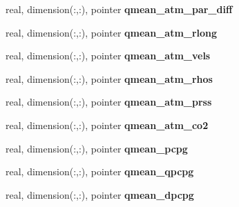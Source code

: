 \begin{DoxyCompactItemize}
\item 
\hypertarget{structed__state__vars_1_1edtype_a729f347831047888a173f91b1528e802}{
real, dimension(:,:), pointer {\bfseries qmean\_\-atm\_\-par\_\-diff}}
\label{structed__state__vars_1_1edtype_a729f347831047888a173f91b1528e802}

\item 
\hypertarget{structed__state__vars_1_1edtype_a7e1ef6fca94d18cf62099af6605ae610}{
real, dimension(:,:), pointer {\bfseries qmean\_\-atm\_\-rlong}}
\label{structed__state__vars_1_1edtype_a7e1ef6fca94d18cf62099af6605ae610}

\item 
\hypertarget{structed__state__vars_1_1edtype_a9226049075f34228b2ad9645bfea5906}{
real, dimension(:,:), pointer {\bfseries qmean\_\-atm\_\-vels}}
\label{structed__state__vars_1_1edtype_a9226049075f34228b2ad9645bfea5906}

\item 
\hypertarget{structed__state__vars_1_1edtype_ad917102325828e0f6bf2cff74c19977e}{
real, dimension(:,:), pointer {\bfseries qmean\_\-atm\_\-rhos}}
\label{structed__state__vars_1_1edtype_ad917102325828e0f6bf2cff74c19977e}

\item 
\hypertarget{structed__state__vars_1_1edtype_add7427e055e0cc736ab6741161d65353}{
real, dimension(:,:), pointer {\bfseries qmean\_\-atm\_\-prss}}
\label{structed__state__vars_1_1edtype_add7427e055e0cc736ab6741161d65353}

\item 
\hypertarget{structed__state__vars_1_1edtype_a5c92ef6430ff924198b4d042e7a106f0}{
real, dimension(:,:), pointer {\bfseries qmean\_\-atm\_\-co2}}
\label{structed__state__vars_1_1edtype_a5c92ef6430ff924198b4d042e7a106f0}

\item 
\hypertarget{structed__state__vars_1_1edtype_a13d1211cf08cb42e7eb997ce59f8e4c1}{
real, dimension(:,:), pointer {\bfseries qmean\_\-pcpg}}
\label{structed__state__vars_1_1edtype_a13d1211cf08cb42e7eb997ce59f8e4c1}

\item 
\hypertarget{structed__state__vars_1_1edtype_a8bbdb1113831033d8522c339ddd8e46a}{
real, dimension(:,:), pointer {\bfseries qmean\_\-qpcpg}}
\label{structed__state__vars_1_1edtype_a8bbdb1113831033d8522c339ddd8e46a}

\item 
\hypertarget{structed__state__vars_1_1edtype_a020870b86d6e5d3cc03363cdc0fc0679}{
real, dimension(:,:), pointer {\bfseries qmean\_\-dpcpg}}
\label{structed__state__vars_1_1edtype_a020870b86d6e5d3cc03363cdc0fc0679}


\end{DoxyCompactItemize}
